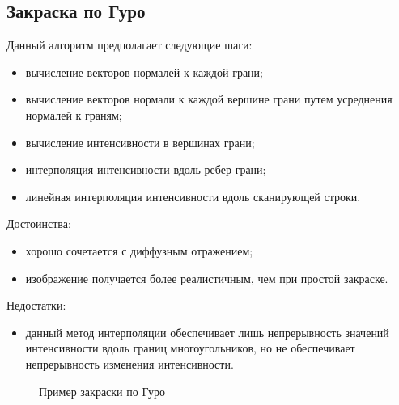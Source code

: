 \subsection{Закраска по Гуро}

Данный алгоритм предполагает следующие шаги:

\begin{itemize}
	\item вычисление векторов нормалей к каждой грани;
	\item вычисление векторов нормали к каждой вершине грани путем усреднения нормалей к граням;
	\item вычисление интенсивности в вершинах грани;
	\item интерполяция интенсивности вдоль ребер грани;
	\item линейная интерполяция интенсивности вдоль сканирующей строки.
\end{itemize}

Достоинства:

\begin{itemize}
	\item хорошо сочетается с диффузным отражением;
	\item изображение получается более реалистичным, чем при простой закраске.
\end{itemize}

Недостатки:

\begin{itemize}
	\item данный метод интерполяции обеспечивает лишь непрерывность значений интенсивности вдоль границ многоугольников, но не обеспечивает непрерывность изменения интенсивности.
\end{itemize}

\begin{figure}[ph!]
	\caption{Пример закраски по Гуро}
	\label{fig:draw_guro}
\end{figure}

